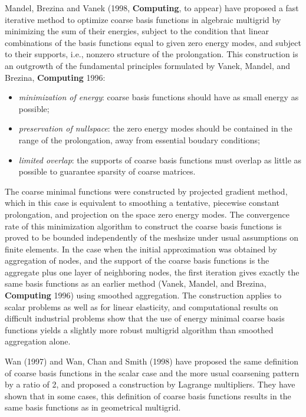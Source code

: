 \documentclass[11pt]{article}
\begin{document}
Mandel, Brezina and Vanek (1998, {\bf Computing}, to appear) have proposed
a fast iterative method to optimize coarse basis functions in algebraic
multigrid by minimizing the sum of their energies, subject to the condition
that linear combinations of the basis functions equal to given zero energy
modes, and subject to their supports, i.e., nonzero structure of the prolongation.
This construction is an outgrowth of the fundamental principles formulated
by Vanek, Mandel, and Brezina, {\bf Computing} 1996:
\begin{itemize}
\item
	{\em minimization of energy}:
	coarse basis functions should have as small energy as possible;
\item
	{\em preservation of nullspace}:
	the zero energy modes should be contained in the range of the
	prolongation, away from essential boudary conditions;
\item
	{\em limited overlap}:
	the supports of coarse basis functions must overlap
	as little as possible to guarantee sparsity of coarse matrices.
\end{itemize}
The coarse minimal functions were constructed by projected gradient method,
which in this case is equivalent to smoothing a tentative, piecewise constant
prolongation, and projection on the space zero energy modes. The convergence
rate of this minimization algorithm to construct the coarse basis functions
is proved to be bounded independently of the meshsize under usual assumptions
on finite elements. In the case when the initial approximation was obtained
by aggregation of nodes, and the support of the coarse basis functions
is the aggregate plus one layer of neighboring nodes, the first iteration
gives exactly the same basis functions as an earlier method
(Vanek, Mandel, and Brezina, {\bf Computing} 1996)
using smoothed aggregation.
The construction applies to scalar problems as well as for linear elasticity,
and computational results on difficult industrial problems show that the
use of energy minimal coarse basis functions yields a slightly more robust
multigrid algorithm than smoothed aggregation alone.

Wan (1997) and Wan, Chan and Smith (1998)
have proposed the same definition of coarse basis
functions in the scalar case and the more usual coarsening pattern by a
ratio of 2, and proposed a construction by Lagrange multipliers. They have
shown that in some cases, this definition of coarse basis functions results
in the same basis functions as in geometrical multigrid.
\end{document}
